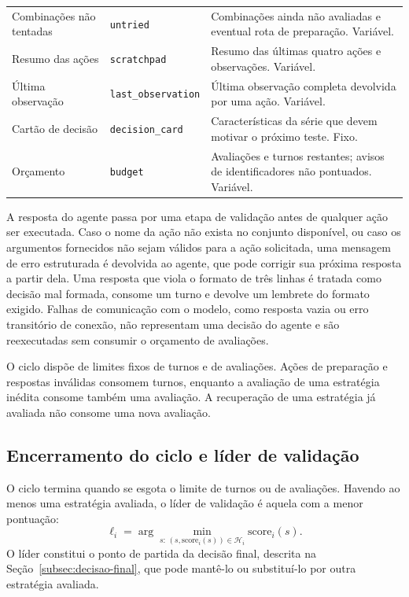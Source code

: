 \begin{table}[H]
\begin{tabular}{@{}p{3.4cm}p{3.8cm}p{6.8cm}@{}}
Combinações não tentadas & \texttt{untried} & Combinações ainda não avaliadas e eventual rota de preparação. Variável. \\
Resumo das ações & \texttt{scratchpad} & Resumo das últimas quatro ações e observações. Variável. \\
Última observação & \texttt{last\_observation} & Última observação completa devolvida por uma ação. Variável. \\
Cartão de decisão & \texttt{decision\_card} & Características da série que devem motivar o próximo teste. Fixo. \\
Orçamento & \texttt{budget} & Avaliações e turnos restantes; avisos de identificadores não pontuados. Variável. \\
\bottomrule
\end{tabular}
\end{table}

A resposta do agente passa por uma etapa de validação antes de qualquer ação ser executada. Caso o nome da ação não exista no conjunto disponível, ou caso os argumentos fornecidos não sejam válidos para a ação solicitada, uma mensagem de erro estruturada é devolvida ao agente, que pode corrigir sua próxima resposta a partir dela. Uma resposta que viola o formato de três linhas é tratada como decisão mal formada, consome um turno e devolve um lembrete do formato exigido. Falhas de comunicação com o modelo, como resposta vazia ou erro transitório de conexão, não representam uma decisão do agente e são reexecutadas sem consumir o orçamento de avaliações.

O ciclo dispõe de limites fixos de turnos e de avaliações. Ações de preparação e respostas inválidas consomem turnos, enquanto a avaliação de uma estratégia inédita consome também uma avaliação. A recuperação de uma estratégia já avaliada não consome uma nova avaliação.

\subsection{Encerramento do ciclo e líder de validação}

O ciclo termina quando se esgota o limite de turnos ou de avaliações. Havendo ao menos uma estratégia avaliada, o líder de validação é aquela com a menor pontuação:
\[
    \ell_i =
    \arg\min_{s:\,(s,\text{score}_i(s)) \in \mathcal{H}_i}
    \text{score}_i(s).
\]
O líder constitui o ponto de partida da decisão final, descrita na Seção~\ref{subsec:decisao-final}, que pode mantê-lo ou substituí-lo por outra estratégia avaliada.


